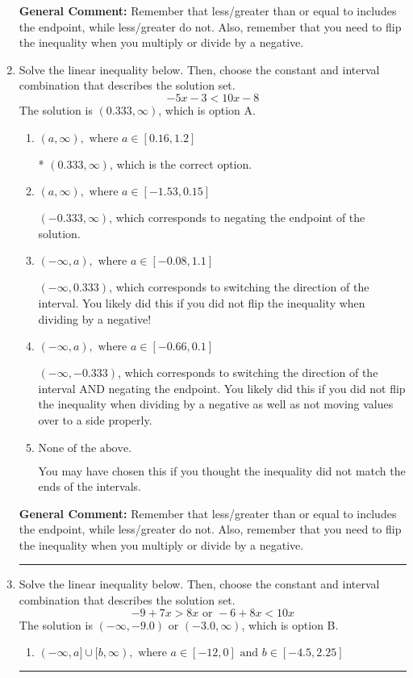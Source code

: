 \documentclass{extbook}[14pt]
\newcommand{\litem}[1]{\item #1

\rule{\textwidth}{0.4pt}}
\begin{document}
\begin{enumerate}
{\textbf{General Comment:} Remember that less/greater than or equal to includes the endpoint, while less/greater do not. Also, remember that you need to flip the inequality when you multiply or divide by a negative.
}
\litem{
Solve the linear inequality below. Then, choose the constant and interval combination that describes the solution set.
\[ -5x -3 < 10x -8 \]The solution is \( (0.333, \infty) \), which is option A.\begin{enumerate}[label=\Alph*.]
\item \( (a, \infty), \text{ where } a \in [0.16, 1.2] \)

* $(0.333, \infty)$, which is the correct option.
\item \( (a, \infty), \text{ where } a \in [-1.53, 0.15] \)

 $(-0.333, \infty)$, which corresponds to negating the endpoint of the solution.
\item \( (-\infty, a), \text{ where } a \in [-0.08, 1.1] \)

 $(-\infty, 0.333)$, which corresponds to switching the direction of the interval. You likely did this if you did not flip the inequality when dividing by a negative!
\item \( (-\infty, a), \text{ where } a \in [-0.66, 0.1] \)

 $(-\infty, -0.333)$, which corresponds to switching the direction of the interval AND negating the endpoint. You likely did this if you did not flip the inequality when dividing by a negative as well as not moving values over to a side properly.
\item \( \text{None of the above}. \)

You may have chosen this if you thought the inequality did not match the ends of the intervals.
\end{enumerate}

\textbf{General Comment:} Remember that less/greater than or equal to includes the endpoint, while less/greater do not. Also, remember that you need to flip the inequality when you multiply or divide by a negative.
}
\litem{
Solve the linear inequality below. Then, choose the constant and interval combination that describes the solution set.
\[ -9 + 7 x > 8 x \text{ or } -6 + 8 x < 10 x \]The solution is \( (-\infty, -9.0) \text{ or } (-3.0, \infty) \), which is option B.\begin{enumerate}[label=\Alph*.]
\item \( (-\infty, a] \cup [b, \infty), \text{ where } a \in [-12, 0] \text{ and } b \in [-4.5, 2.25] \)


\end{enumerate}}
\end{enumerate}
\end{document}
